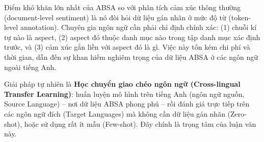 \documentclass[12pt,a4paper,oneside]{report}
\begin{document}
Điểm khó khăn lớn nhất của ABSA so với phân tích cảm xúc thông thường (document-level sentiment) là nó đòi hỏi dữ liệu gán nhãn ở mức độ từ (token-level annotation). Chuyên gia ngôn ngữ cần phải chỉ định chính xác: (1) chuỗi kí tự nào là aspect, (2) aspect đó thuộc danh mục nào trong tập danh mục xác định trước, và (3) cảm xúc gắn liền với aspect đó là gì. Việc này tốn kém chi phí và thời gian, dẫn đến sự khan hiếm nghiêm trọng của dữ liệu ABSA ở các ngôn ngữ ngoài tiếng Anh.

Giải pháp tự nhiên là \textbf{Học chuyển giao chéo ngôn ngữ (Cross-lingual Transfer Learning)}: huấn luyện mô hình trên tiếng Anh (ngôn ngữ nguồn, Source Language) -- nơi dữ liệu ABSA phong phú -- rồi đánh giá trực tiếp trên các ngôn ngữ đích (Target Languages) mà không cần dữ liệu gán nhãn (Zero-shot), hoặc sử dụng rất ít mẫu (Few-shot). Đây chính là trọng tâm của luận văn này.
\end{document}
